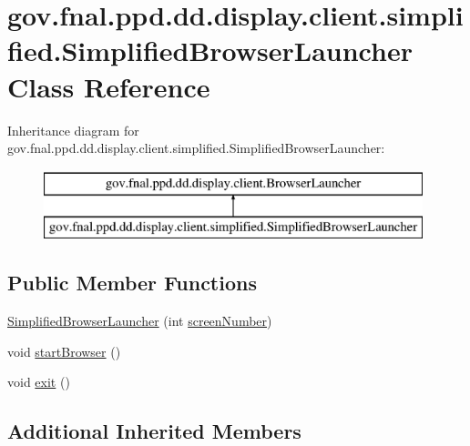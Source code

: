 \hypertarget{classgov_1_1fnal_1_1ppd_1_1dd_1_1display_1_1client_1_1simplified_1_1SimplifiedBrowserLauncher}{\section{gov.\-fnal.\-ppd.\-dd.\-display.\-client.\-simplified.\-Simplified\-Browser\-Launcher Class Reference}
\label{classgov_1_1fnal_1_1ppd_1_1dd_1_1display_1_1client_1_1simplified_1_1SimplifiedBrowserLauncher}
}
Inheritance diagram for gov.\-fnal.\-ppd.\-dd.\-display.\-client.\-simplified.\-Simplified\-Browser\-Launcher\-:\begin{figure}[H]
\begin{center}
\leavevmode
\includegraphics[height=2.000000cm]{classgov_1_1fnal_1_1ppd_1_1dd_1_1display_1_1client_1_1simplified_1_1SimplifiedBrowserLauncher}
\end{center}
\end{figure}
\subsection*{Public Member Functions}
\begin{DoxyCompactItemize}
\item 
\hyperlink{classgov_1_1fnal_1_1ppd_1_1dd_1_1display_1_1client_1_1simplified_1_1SimplifiedBrowserLauncher_a1d6855890b2dec937d192ff285a93116}{Simplified\-Browser\-Launcher} (int \hyperlink{classgov_1_1fnal_1_1ppd_1_1dd_1_1display_1_1client_1_1BrowserLauncher_aa30aa801b0b7b60138f39610c4e2f211}{screen\-Number})
\item 
void \hyperlink{classgov_1_1fnal_1_1ppd_1_1dd_1_1display_1_1client_1_1simplified_1_1SimplifiedBrowserLauncher_a3c45c5bd1ba2dd6e5da7249ab728cc8a}{start\-Browser} ()
\item 
void \hyperlink{classgov_1_1fnal_1_1ppd_1_1dd_1_1display_1_1client_1_1simplified_1_1SimplifiedBrowserLauncher_aaccf4b7866916cef5710eee260379831}{exit} ()
\end{DoxyCompactItemize}
\subsection*{Additional Inherited Members}


